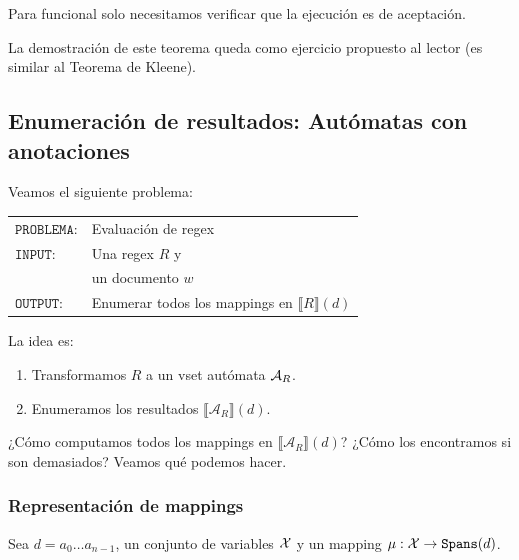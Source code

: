 Para funcional solo necesitamos verificar que la ejecución es de aceptación.

La demostración de este teorema queda como ejercicio propuesto al lector (es similar al Teorema de Kleene).

\subsection{Enumeración de resultados: Autómatas con anotaciones}

Veamos el siguiente problema:
\begin{table}[H]
    \centering
    \begin{tabular}{ll}
        $\texttt{PROBLEMA:}$ & Evaluación de regex                                         \\
        $\texttt{INPUT:}$    & Una regex $R$ y                                             \\
                             & un documento $w$                                            \\
        $\texttt{OUTPUT:}$   & Enumerar todos los mappings en $\llbracket R \rrbracket(d)$
    \end{tabular}
\end{table}
La idea es:
\begin{enumerate}
    \item Transformamos $R$ a un vset autómata $\mathcal{A}_R$.
    \item Enumeramos los resultados $\llbracket \mathcal{A}_R \rrbracket(d)$.
\end{enumerate}
¿Cómo computamos todos los mappings en $\llbracket \mathcal{A}_R \rrbracket(d)$? ¿Cómo los encontramos si son demasiados? Veamos qué podemos hacer.

\subsubsection{Representación de mappings}
Sea $d = a_0 \ldots a_{n-1}$, un conjunto de variables $\mathcal{X}$ y un mapping $\mu: \mathcal{X} \to \texttt{Spans}(d)$.


